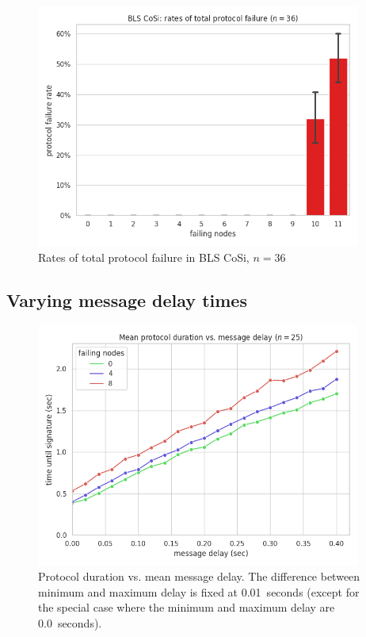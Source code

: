 \begin{figure}[H]
    \centering
    \includegraphics[width=0.95\textwidth]{figures/1/failures_36.png}
    \captionsetup{labelformat=empty}
    \caption{Rates of total protocol failure in BLS CoSi, $n = 36$}
\end{figure}


\newpage
\subsection*{Varying message delay times}

\begin{figure}[H]
    \centering
    \includegraphics[width=0.95\textwidth]{figures/2/round_wall_sum_by_delay.png}
    \captionsetup{labelformat=empty}
    \caption{Protocol duration vs. mean message delay. The difference between minimum and maximum delay is fixed at 0.01~seconds (except for the special case where the minimum and maximum delay are 0.0~seconds).}
\end{figure}

